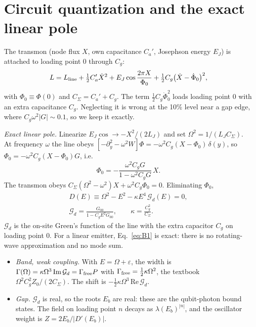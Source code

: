 \documentclass[aps,prresearch,twocolumn,superscriptaddress,nofootinbib,longbibliography,floatfix]{revtex4-2}
\newcommand{\G}{\mathcal{G}}
\begin{document}
\section{Circuit quantization and the exact linear pole}\label{app:circuit}

The transmon (node flux $X$, own capacitance $C_a'$, Josephson energy $E_J$) is attached to loading point $0$ through
$C_g$:
\begin{equation}
L=L_{\rm line}+\tfrac12C_a'\dot X^2+E_J\cos\frac{2\pi X}{\Phi_0}+\tfrac12C_g\big(\dot X-\dot\Phi_0\big)^2,
\end{equation}
with $\Phi_0\equiv\Phi(0)$ and $C_\Sigma=C_a'+C_g$. The term $\tfrac12C_g\dot\Phi_0^2$ loads loading point $0$ with an
extra capacitance $C_g$. Neglecting it is wrong at the 10\% level near a gap edge, where $C_g\omega^2|G|\sim0.1$, so we
keep it exactly.

\emph{Exact linear pole.} Linearize $E_J\cos\to-X^2/(2L_J)$ and set $\Omega^2=1/(L_JC_\Sigma)$. At frequency $\omega$
the line obeys $[-\partial_y^2-\omega^2W]\Phi=-\omega^2C_g(X-\Phi_0)\,\delta(y)$, so
$\Phi_0=-\omega^2C_g(X-\Phi_0)G$, i.e.
\begin{equation}
\Phi_0=-\frac{\omega^2C_gG}{1-\omega^2C_gG}\,X .
\end{equation}
The transmon obeys $C_\Sigma(\Omega^2-\omega^2)X+\omega^2C_g\Phi_0=0$. Eliminating $\Phi_0$,
\begin{gather}
D(E)\equiv\Omega^2-E^2-\kappa E^4\,\G_d(E)=0,\label{eq:B1}\\
\G_d=\frac{G_{00}}{1-C_gE^2G_{00}},\qquad\kappa=\frac{C_g^2}{C_\Sigma}.\nonumber
\end{gather}
$\G_d$ is the on-site Green's function of the line with the extra capacitor $C_g$ on loading point 0. For a linear
emitter, Eq.~\eqref{eq:B1} is exact: there is no rotating-wave approximation and no mode sum.
\begin{itemize}
\item \emph{Band, weak coupling.} With $E=\Omega+\varepsilon$, the width is
$\Gamma(\Omega)=\kappa\Omega^3\,\mathrm{Im}\,\G_d=\Gamma_{\rm free}P$ with $\Gamma_{\rm free}=\tfrac12\kappa\Omega^2$, the
textbook $\Omega^2C_g^2Z_0/(2C_\Sigma)$. The shift is $-\tfrac12\kappa\Omega^3\,\mathrm{Re}\,\G_d$.
\item \emph{Gap.} $\G_d$ is real, so the roots $E_b$ are real: these are the qubit-photon bound states. The field on
loading point $n$ decays as $\lambda(E_b)^{|n|}$, and the oscillator weight is $Z=2E_b/|D'(E_b)|$.
\end{itemize}
\end{document}
